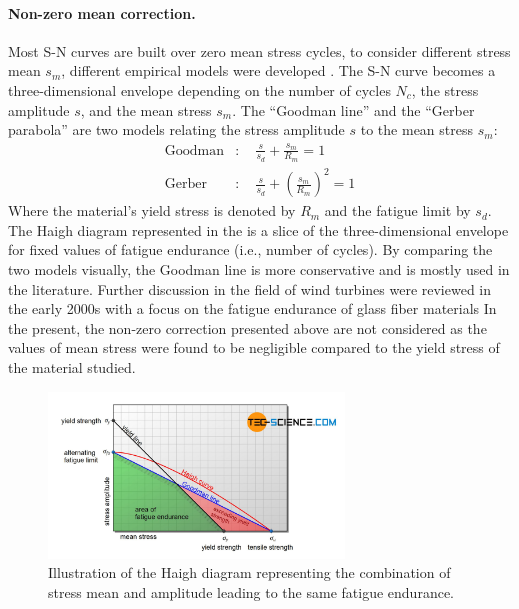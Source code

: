 \paragraph{Non-zero mean correction.}
Most S-N curves are built over zero mean stress cycles, to consider different stress mean $s_m$, different empirical models were developed \citep{suresh_1998_fatigue_book}. 
The S-N curve becomes a three-dimensional envelope depending on the number of cycles $N_c$, the stress amplitude $s$, and the mean stress $s_m$. 
The ``Goodman line'' and the ``Gerber parabola'' are two models relating the stress amplitude $s$ to the mean stress $s_m$:  
\begin{align}
    \mathrm{Goodman} &:\quad \frac{s}{s_d} + \frac{s_m}{R_m} = 1\\
    \mathrm{Gerber} &:\quad \frac{s}{s_d} + \left(\frac{s_m}{R_m}\right)^2 = 1
\end{align}
Where the material's yield stress is denoted by $R_m$ and the fatigue limit by $s_d$. 
The Haigh diagram represented in the  is a slice of the three-dimensional envelope for fixed values of fatigue endurance (i.e., number of cycles).
By comparing the two models visually, the Goodman line is more conservative and is mostly used in the literature. 
Further discussion in the field of wind turbines were reviewed in the early 2000s with a focus on the fatigue endurance of glass fiber materials \citep{sutherland_2000_fatigueWT} 
In the present, the non-zero correction presented above are not considered as the values of mean stress were found to be negligible compared to the yield stress of the material studied. 

\begin{figure}
    \centering
    \includegraphics[width=0.7\textwidth]{./part1/figures/haigh-diagram.jpg}
    \caption{Illustration of the Haigh diagram representing the combination of stress mean and amplitude leading to the same fatigue endurance.}
    \label{fig:haigh_diagram}
\end{figure}



